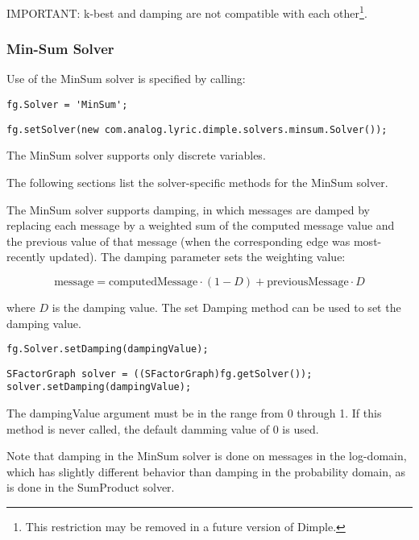 IMPORTANT: k-best and damping are not compatible with each other\footnote{This restriction may be removed in a future version of Dimple.}.





\subsubsection{Min-Sum Solver}

Use of the MinSum solver is specified by calling:

\ifmatlab
\begin{lstlisting}
fg.Solver = 'MinSum';
\end{lstlisting}
\fi

\ifjava
\begin{lstlisting}
fg.setSolver(new com.analog.lyric.dimple.solvers.minsum.Solver());
\end{lstlisting}
\fi

The MinSum solver supports only discrete variables.

The following sections list the solver-specific methods for the MinSum solver.



The MinSum solver supports damping, in which messages are damped by replacing each message by a weighted sum of the computed message value and the previous value of that message (when the corresponding edge was most-recently updated).  The damping parameter sets the weighting value:

\[
\mathrm{message} = \mathrm{computedMessage} \cdot (1 - D) + \mathrm{previousMessage} \cdot D
\]

where $D$ is the damping value.  The set Damping method can be used to set the damping value.

\ifmatlab
\begin{lstlisting}
fg.Solver.setDamping(dampingValue);
\end{lstlisting}
\fi

\ifjava
\begin{lstlisting}
SFactorGraph solver = ((SFactorGraph)fg.getSolver());
solver.setDamping(dampingValue);
\end{lstlisting}
\fi


The dampingValue argument must be in the range from 0 through 1.  If this method is never called, the default damming value of 0 is used.

Note that damping in the MinSum solver is done on messages in the log-domain, which has slightly different behavior than damping in the probability domain, as is done in the SumProduct solver.


